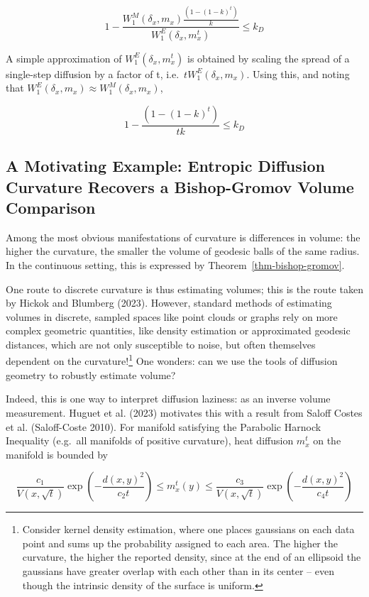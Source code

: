 \documentclass[
  letterpaper,
  DIV=11,
  numbers=noendperiod]{scrartcl}
\theoremstyle{plain}
\theoremstyle{plain}
\theoremstyle{definition}
\theoremstyle{plain}
\theoremstyle{definition}
\theoremstyle{remark}
\begin{document}
\[
1 - \frac{W^M_1\left(\delta_x,m_x\right)\frac{(1-(1-k)^t)}{k}}{W_{1}^E(\delta_{x},m_{x}^t)} \leq k_{D}
\]

A simple approximation of \(W_{1}^E(\delta_{x},m_{x}^t)\) is obtained by
scaling the spread of a single-step diffusion by a factor of t,
i.e.~\(tW_{1}^E(\delta_{x},m_{x})\). Using this, and noting that
\(W_{1}^E(\delta_{x},m_{x}) \approx W_{1}^M(\delta_{x},m_{x})\),

\[
1 - \frac{(1-(1-k)^t)}{tk} \leq k_{D}
\]

\subsection{A Motivating Example: Entropic Diffusion Curvature Recovers
a Bishop-Gromov Volume
Comparison}\label{a-motivating-example-entropic-diffusion-curvature-recovers-a-bishop-gromov-volume-comparison}

Among the most obvious manifestations of curvature is differences in
volume: the higher the curvature, the smaller the volume of geodesic
balls of the same radius. In the continuous setting, this is expressed
by Theorem~\ref{thm-bishop-gromov}.

One route to discrete curvature is thus estimating volumes; this is the
route taken by Hickok and Blumberg (2023). However, standard methods of
estimating volumes in discrete, sampled spaces like point clouds or
graphs rely on more complex geometric quantities, like density
estimation or approximated geodesic distances, which are not only
susceptible to noise, but often themselves dependent on the
curvature!\footnote{Consider kernel density estimation, where one places
  gaussians on each data point and sums up the probability assigned to
  each area. The higher the curvature, the higher the reported density,
  since at the end of an ellipsoid the gaussians have greater overlap
  with each other than in its center -- even though the intrinsic
  density of the surface is uniform.} One wonders: can we use the tools
of diffusion geometry to robustly estimate volume?

Indeed, this is one way to interpret diffusion laziness: as an inverse
volume measurement. Huguet et al. (2023) motivates this with a result
from Saloff Costes et al. (Saloff-Coste 2010). For manifold satisfying
the Parabolic Harnock Inequality (e.g.~all manifolds of positive
curvature), heat diffusion \(m_{x}^t\) on the manifold is bounded by

\[
\frac{c_1}{V(x, \sqrt{t})} \exp \left(-\frac{d(x, y)^2}{c_2 t}\right) \leq m_{x}^t(y) \leq \frac{c_3}{V(x, \sqrt{t})} \exp \left(-\frac{d(x, y)^2}{c_4 t}\right)
\]
\end{document}
